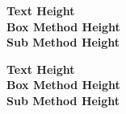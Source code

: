 \documentclass[a4paper]{book}
\newlength{\boxmethodlength}
\newlength{\submethodlength}
\begin{document}

\savebox{}%
\usebox\tempbox


\setlength{\submethodlength}{\dimexpr \pagegoal-\pagetotal}
\setlength{\boxmethodlength}{\dimexpr \textheight-\ht\tempbox}


\lipsum[2]

\textbf{Text Height \the\textheight} \\
\textbf{Box Method Height \the\boxmethodlength} \\
\textbf{Sub Method Height \the\submethodlength} \\

\lipsum[2]

\newpage

\lipsum[2]


\setlength{\submethodlength}{\dimexpr \pagegoal-\pagetotal}
\setlength{\boxmethodlength}{\dimexpr \textheight-\ht\tempbox}


\textbf{Text Height \the\textheight} \\
\textbf{Box Method Height \the\boxmethodlength} \\
\textbf{Sub Method Height \the\submethodlength} \\

\lipsum[2]
\end{document}
